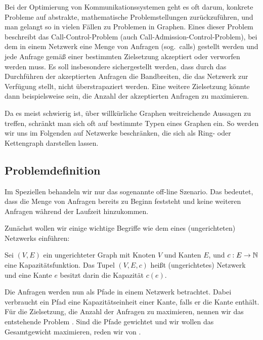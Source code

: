 Bei der Optimierung von Kommunikationssystemen geht es oft darum, konkrete Probleme auf abstrakte, mathematische 
Problemstellungen zurückzuführen, und man gelangt so in vielen Fällen zu Problemen in Graphen.
Eines dieser Problem beschreibt das Call-Control-Problem (auch Call-Admission-Control-Problem), bei dem
in einem Netzwerk eine Menge von Anfragen (sog.\ calls) gestellt werden und jede Anfrage gemäß einer bestimmten Zielsetzung
akzeptiert oder verworfen werden muss.
Es soll insbesondere sichergestellt werden, dass durch das Durchführen der akzeptierten Anfragen die Bandbreiten,
die das Netzwerk zur Verfügung stellt, nicht überstrapaziert werden.
Eine weitere Zielsetzung könnte dann beispielsweise sein, die Anzahl der akzeptierten Anfragen zu maximieren.

Da es meist schwierig ist, über willkürliche Graphen weitreichende Aussagen zu treffen, schränkt
man sich oft auf bestimmte Typen eines Graphen ein.
So werden wir uns im Folgenden auf Netzwerke beschränken, die sich als Ring- oder Kettengraph darstellen lassen.

\subsection{Problemdefinition}
Im Speziellen behandeln wir nur das sogenannte off-line Szenario.
Das bedeutet, dass die Menge von Anfragen bereits zu Beginn feststeht und keine weiteren Anfragen während der
Laufzeit hinzukommen.

Zunächst wollen wir einige wichtige Begriffe wie dem eines (ungerichteten) Netzwerks einführen:

\begin{definition}[Netzwerk]
	Sei $(V,E)$ ein ungerichteter Graph mit Knoten $V$ und Kanten $E$, und $c: E \to \mathbb N$ eine Kapazitätsfunktion.
	Das Tupel $(V,E,c)$ heißt (ungerichtetes) Netzwerk und eine Kante $e$ besitzt darin die Kapazität $c(e)$.
\end{definition}

Die Anfragen werden nun als Pfade in einem Netzwerk betrachtet.
Dabei verbraucht ein Pfad eine Kapazitätseinheit einer Kante, falls er die Kante enthält.
Für die Zielsetzung, die Anzahl der Anfragen zu maximieren, nennen wir das entstehende Problem \CallControl.
Sind die Pfade gewichtet und wir wollen das Gesamtgewicht maximieren, reden wir von \WeightedCallControl.

